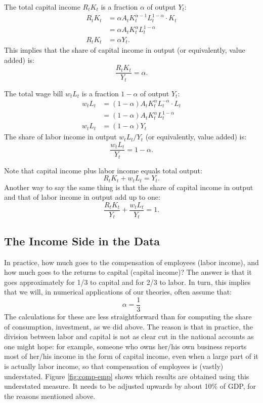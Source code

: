 \documentclass[]{book}
\begin{document}
The total capital income \(R_t K_t\) is a fraction \(\alpha\) of output
\(Y_t\): \[
\begin{aligned}
R_t K_t &= \alpha A_t K_t^{\alpha-1} L_t^{1-\alpha} \cdot K_t \\
&= \alpha A_t K_t^{\alpha} L_t^{1-\alpha}\\
R_t K_t &= \alpha Y_t.
\end{aligned}
\] This implies that the share of capital income in output (or
equivalently, value added) is: \[\boxed{\frac{R_t K_t}{Y_t}=\alpha}.\]

The total wage bill \(w_t L_t\) is a fraction \(1-\alpha\) of output
\(Y_t\): \[
\begin{aligned}
w_t L_t &= (1-\alpha) A_t K_t^{\alpha} L_t^{-\alpha} \cdot L_t \\
&= (1-\alpha) A_t K_t^{\alpha} L_t^{1-\alpha}\\
w_t L_t &= (1-\alpha) Y_t
\end{aligned}
\] The share of labor income in output \(w_t L_t/Y_t\) (or equivalently,
value added) is: \[\boxed{\frac{w_t L_t}{Y_t}=1-\alpha}.\]

Note that capital income plus labor income equals total output:
\[R_t K_t + w_t L_t = Y_t.\] Another way to say the same thing is that
the share of capital income in output and that of labor income in output
add up to one: \[\boxed{\frac{R_t K_t}{Y_t} + \frac{w_t L_t}{Y_t}=1}.\]

\subsection{The Income Side in the
Data}\label{the-income-side-in-the-data}

In practice, how much goes to the compensation of employees (labor
income), and how much goes to the returns to capital (capital income)?
The answer is that it goes approximately for 1/3 to capital and for 2/3
to labor. In turn, this implies that we will, in numerical applications
of our theories, often assume that: \[\alpha = \frac{1}{3}\] The
calculations for these are less straightforward than for computing the
share of consumption, investment, as we did above. The reason is that in
practice, the division between labor and capital is not as clear cut in
the national accounts as one might hope: for example, someone who owns
her/his own business reports most of her/his income in the form of
capital income, even when a large part of it is actually labor income,
so that compensation of employees is (vastly) understated. Figure
\ref{fig:comp-emp} shows which results are obtained using this
understated measure. It needs to be adjusted upwards by about 10\% of
GDP, for the reasons mentioned above.
\end{document}
